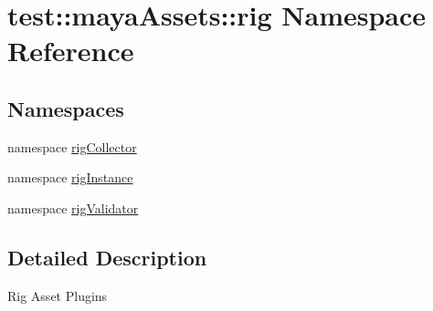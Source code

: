 \hypertarget{namespacetest_1_1mayaAssets_1_1rig}{\section{test\-:\-:maya\-Assets\-:\-:rig \-Namespace \-Reference}
\label{db/d7c/namespacetest_1_1mayaAssets_1_1rig}
}
\subsection*{\-Namespaces}
\begin{DoxyCompactItemize}
\item 
namespace \hyperlink{namespacetest_1_1mayaAssets_1_1rig_1_1rigCollector}{rig\-Collector}
\item 
namespace \hyperlink{namespacetest_1_1mayaAssets_1_1rig_1_1rigInstance}{rig\-Instance}
\item 
namespace \hyperlink{namespacetest_1_1mayaAssets_1_1rig_1_1rigValidator}{rig\-Validator}
\end{DoxyCompactItemize}


\subsection{\-Detailed \-Description}
\begin{DoxyVerb}
Rig Asset Plugins
\end{DoxyVerb}
 